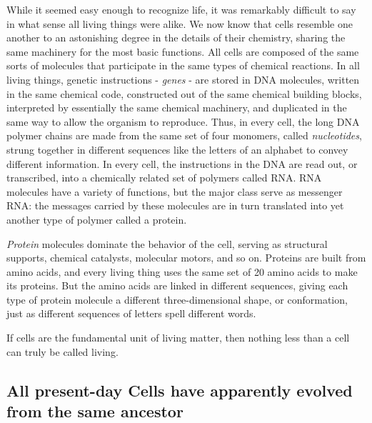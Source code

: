 While it seemed easy enough to recognize life, it was remarkably difficult to
say in what sense all living things were alike.
We now know that cells resemble one another to an astonishing
degree in the details of their chemistry, sharing the same machinery
for the most basic functions. All cells are composed of the same sorts of
molecules that participate in the same types of chemical reactions.
In all living things, genetic instructions - \textit{genes} - are
stored in DNA molecules, written in the same chemical code, constructed
out of the same chemical building blocks, interpreted by essentially the
same chemical machinery, and duplicated in the same way to allow the
organism to reproduce. Thus, in every cell, the long DNA polymer chains
are made from the same set of four monomers, called \textit{nucleotides}, strung
together in different sequences like the letters of an alphabet to convey
different information. In every cell, the instructions in the DNA are read
out, or transcribed, into a chemically related set of polymers called RNA.
RNA molecules have a variety of functions, but the major
class serve as messenger RNA: the messages carried by these molecules
are in turn translated into yet another type of polymer called a protein.

\textit{Protein} molecules dominate the behavior of the cell, serving as structural
supports, chemical catalysts, molecular motors, and so on. Proteins
are built from amino acids, and every living thing uses the same set of
20 amino acids to make its proteins. But the amino acids are linked in
different sequences, giving each type of protein molecule a different
three-dimensional shape, or conformation, just as different sequences
of letters spell different words.

If cells are the fundamental unit of living matter, then nothing less than a
cell can truly be called living.

\subsection{All present-day Cells have apparently evolved from the same ancestor}

